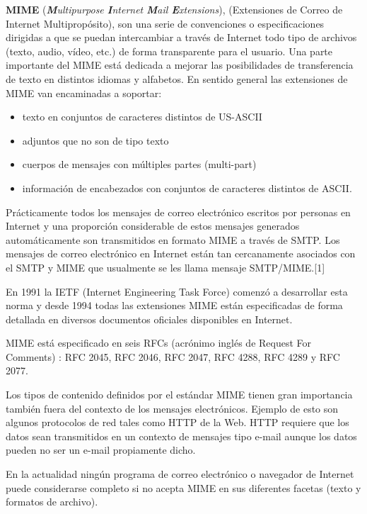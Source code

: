 \documentclass[a4paper]{report}
\begin{document}
\textbf{MIME} \label{mime}(\textit{\textbf{M}ultipurpose \textbf{I}nternet \textbf{M}ail \textbf{E}xtensions}), 
(Extensiones de Correo de Internet Multipropósito), son una serie de
convenciones o especificaciones dirigidas a que se puedan intercambiar a través
de Internet todo tipo de archivos (texto, audio, vídeo, etc.) de forma
transparente para el usuario. Una parte importante del MIME está dedicada a
mejorar las posibilidades de transferencia de texto en distintos idiomas y
alfabetos. En sentido general las extensiones de MIME van encaminadas a
soportar:
\begin{itemize}
 \item texto en conjuntos de caracteres distintos de US-ASCII
 \item adjuntos que no son de tipo texto
 \item cuerpos de mensajes con múltiples partes (multi-part)
 \item información de encabezados con conjuntos de caracteres distintos de ASCII.
\end{itemize}

Prácticamente todos los mensajes de correo electrónico escritos por personas en
Internet y una proporción considerable de estos mensajes generados
automáticamente son transmitidos en formato MIME a través de SMTP. Los mensajes
de correo electrónico en Internet están tan cercanamente asociados con el SMTP y
MIME que usualmente se les llama mensaje SMTP/MIME.[1]

En 1991 la IETF (Internet Engineering Task Force) comenzó a desarrollar esta
norma y desde 1994 todas las extensiones MIME están especificadas de forma
detallada en diversos documentos oficiales disponibles en Internet.

MIME está especificado en seis RFCs (acrónimo inglés de Request For Comments) :
RFC 2045, RFC 2046, RFC 2047, RFC 4288, RFC 4289 y RFC 2077.

Los tipos de contenido definidos por el estándar MIME tienen gran importancia
también fuera del contexto de los mensajes electrónicos. Ejemplo de esto son
algunos protocolos de red tales como HTTP de la Web. HTTP requiere que los datos
sean transmitidos en un contexto de mensajes tipo e-mail aunque los datos pueden
no ser un e-mail propiamente dicho.

En la actualidad ningún programa de correo electrónico o navegador de Internet
puede considerarse completo si no acepta MIME en sus diferentes facetas (texto y
formatos de archivo).
\end{document}
